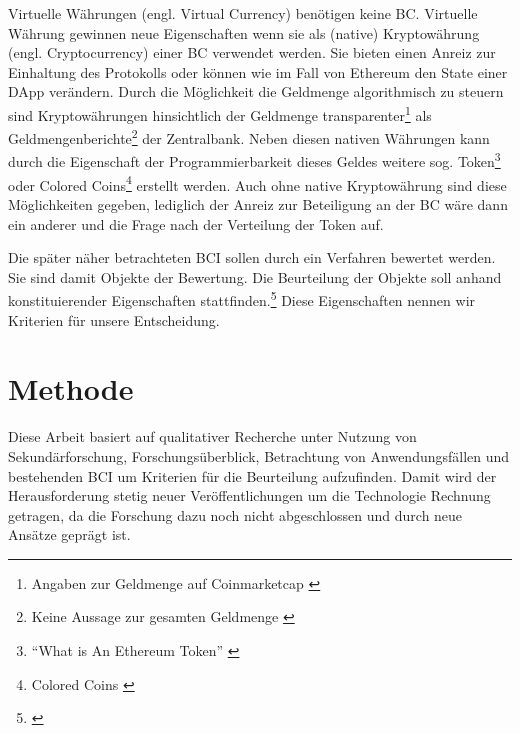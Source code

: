 Virtuelle Währungen (engl. Virtual Currency) benötigen keine \gls{BC}.
Virtuelle Währung gewinnen neue Eigenschaften wenn sie als (native) Kryptowährung (engl. Cryptocurrency) einer \gls{BC} verwendet werden.
Sie bieten einen Anreiz zur Einhaltung des Protokolls oder können wie im Fall von Ethereum den State einer \gls{DApp} verändern.
Durch die Möglichkeit die Geldmenge algorithmisch zu steuern sind Kryptowährungen hinsichtlich der Geldmenge transparenter\footnote{Angaben zur Geldmenge \zB{} auf Coinmarketcap \autocite{w:cmc}} als Geldmengenberichte\footnote{Keine Aussage zur gesamten Geldmenge \autocite{w:ecb-moneydev}} der Zentralbank.
Neben diesen nativen Währungen kann \ua{} durch die Eigenschaft der Programmierbarkeit dieses Geldes weitere sog. Token\footnote{\enquote{What is An Ethereum Token} \autocite{w:eth-token}} oder Colored Coins\footnote{Colored Coins \autocite{b:mastering-bitcoin}%
} erstellt werden.
Auch ohne native Kryptowährung sind diese Möglichkeiten gegeben, lediglich der Anreiz zur Beteiligung an der \gls{BC} wäre dann ein anderer und die Frage nach der Verteilung der Token auf.

Die später näher betrachteten \gls{BCI} sollen durch ein Verfahren bewertet werden.
Sie sind damit Objekte der Bewertung.
Die Beurteilung der Objekte soll anhand konstituierender Eigenschaften stattfinden.\footnote{\cite{b:strassert:entscheidungen}}
Diese Eigenschaften nennen wir Kriterien für unsere Entscheidung.

\section{Methode}

Diese Arbeit basiert auf qualitativer Recherche unter Nutzung von Sekundärforschung, Forschungsüberblick, Betrachtung von Anwendungsfällen und bestehenden \gls{BCI} um Kriterien für die Beurteilung aufzufinden.
Damit wird der Herausforderung stetig neuer Veröffentlichungen um die Technologie Rechnung getragen, da die Forschung dazu noch nicht abgeschlossen und durch neue Ansätze geprägt ist.

